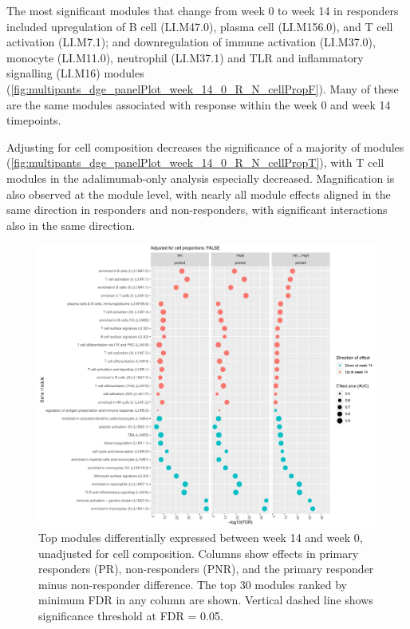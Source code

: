 The most significant modules that change from week 0 to week 14 in responders included
upregulation of B cell (LI.M47.0), plasma cell (LI.M156.0), and T cell activation (LI.M7.1);
and downregulation of immune activation (LI.M37.0), monocyte (LI.M11.0), neutrophil (LI.M37.1) and TLR and inflammatory signalling (LI.M16) modules (\autoref{fig:multipants_dge_panelPlot_week_14_0_R_N_cellPropF}).
Many of these are the same modules associated with response within the week 0 and week 14 timepoints.

Adjusting for cell composition decreases the significance of a majority of modules (\autoref{fig:multipants_dge_panelPlot_week_14_0_R_N_cellPropT}),
with T cell modules in the adalimumab-only analysis especially decreased.
Magnification is also observed at the module level, with nearly all module effects aligned in the same direction in responders and non-responders, with significant interactions also in the same direction.

\begin{figure}
    \centering
    \includegraphics[width=1.0\textwidth,page=1]{mainmatter/figures/chapter_04/plot_gene_set_enrichment.tmodCERNO_panelplot_reversed_C_3R_1R,C_3N_1N,C_(3R_1R)_(3N_1N).cell_prop_correction_FALSE.pdf}
    \caption{Top modules differentially expressed between week 14 and week 0, unadjusted for cell composition. Columns show effects in primary responders (PR), non-responders (PNR), and the primary responder minus non-responder difference. The top 30 modules ranked by minimum \gls{FDR} in any column are shown. Vertical dashed line shows significance threshold at FDR = 0.05.}
    \label{fig:multipants_dge_panelPlot_week_14_0_R_N_cellPropF}
\end{figure}

